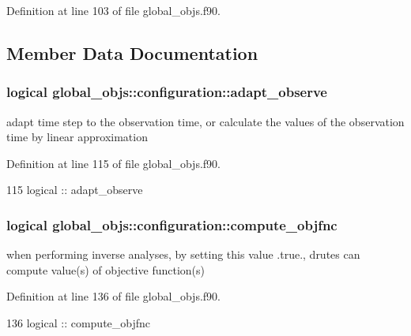 Definition at line 103 of file global\+\_\+objs.\+f90.



\subsection{Member Data Documentation}
\subsubsection[{adapt\+\_\+observe}]{\setlength{\rightskip}{0pt plus 5cm}logical global\+\_\+objs\+::configuration\+::adapt\+\_\+observe}\label{structglobal__objs_1_1configuration_a0eb96b184f0da4338a476b22d69d9716}


adapt time step to the observation time, or calculate the values of the observation time by linear approximation 



Definition at line 115 of file global\+\_\+objs.\+f90.


\begin{DoxyCode}
115     \textcolor{keywordtype}{logical}    :: adapt\_observe
\end{DoxyCode}
\subsubsection[{compute\+\_\+objfnc}]{\setlength{\rightskip}{0pt plus 5cm}logical global\+\_\+objs\+::configuration\+::compute\+\_\+objfnc}\label{structglobal__objs_1_1configuration_ad28f952cb4c3316ecbf72b824a45f281}


when performing inverse analyses, by setting this value .true., drutes can compute value(s) of objective function(s) 



Definition at line 136 of file global\+\_\+objs.\+f90.


\begin{DoxyCode}
136     \textcolor{keywordtype}{logical} :: compute\_objfnc
\end{DoxyCode}
